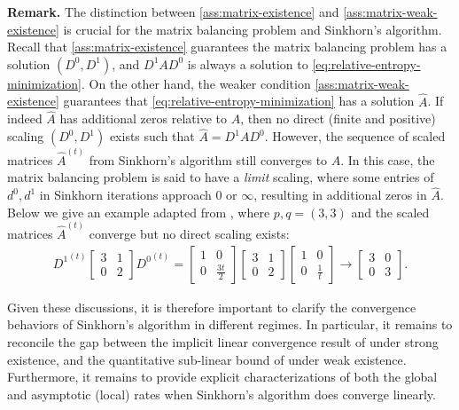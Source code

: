 \textbf{Remark.} The distinction between \cref{ass:matrix-existence} and \cref{ass:matrix-weak-existence} is crucial for the matrix balancing problem and Sinkhorn's algorithm. Recall that \cref{ass:matrix-existence} guarantees the matrix balancing problem has a solution $(D^0,D^1)$, and $D^1AD^0$ is always a solution to \eqref{eq:relative-entropy-minimization}. On the other hand, the weaker condition \cref{ass:matrix-weak-existence} guarantees that \eqref{eq:relative-entropy-minimization} has a solution $\hat A$.
If indeed $\hat A$ has additional zeros relative to $A$, then no direct (finite and positive) scaling $(D^{0},D^{1})$ exists such that $\hat A=D^1AD^0$. However, the sequence of scaled matrices $\hat A^{(t)}$ from Sinkhorn's algorithm still converges to $\hat A$. In this case, the matrix balancing problem is said to have a \emph{limit} scaling, where some entries of $d^{0},d^{1}$ in Sinkhorn iterations approach 0 or $\infty$, resulting in additional zeros in $\hat A$. Below we give an example adapted from \citet{pukelsheim2009iterative}, where $p,q=(3,3)$ and the scaled matrices $\hat A^{(t)}$ converge but no direct scaling exists:
\begin{align*}
{D^{1}}^{(t)}\begin{bmatrix}3&1\\
0 & 2
\end{bmatrix}{D^{0}}^{(t)} = \begin{bmatrix}1&0\\
0 & \frac{3t}{2}
\end{bmatrix}\begin{bmatrix}3&1\\
0 & 2
\end{bmatrix}\begin{bmatrix}1&0\\
0 & \frac{1}{t}
\end{bmatrix}	\rightarrow \begin{bmatrix}3&0\\
0 & 3
\end{bmatrix}.
\end{align*}

Given these discussions, it is therefore important to clarify the convergence behaviors of Sinkhorn's algorithm in different regimes. In particular, it remains to reconcile the gap between the implicit linear convergence result of \citet{luo1992convergence} under strong existence, and the quantitative sub-linear bound of \citet{leger2021gradient} under weak existence. Furthermore, it remains to provide explicit characterizations of both the global and asymptotic (local) rates when Sinkhorn's algorithm does converge linearly. 

